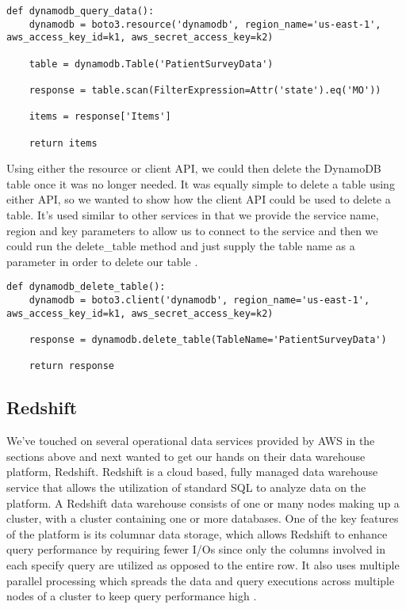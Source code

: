 \begin{verbatim}
def dynamodb_query_data():
    dynamodb = boto3.resource('dynamodb', region_name='us-east-1', aws_access_key_id=k1, aws_secret_access_key=k2)

    table = dynamodb.Table('PatientSurveyData')

    response = table.scan(FilterExpression=Attr('state').eq('MO'))

    items = response['Items']

    return items
\end{verbatim}

Using either the resource or client API, we could then delete the DynamoDB table once it was no longer needed. It was equally simple to delete a table using either API, so we wanted to show how the client API could be used to delete a table. It's used similar to other services in that we provide the service name, region and key parameters to allow us to connect to the service and then we could run the delete_table method and just supply the table name as a parameter in order to delete our table \cite{hid-sp18-521-botodynamodb}.  

\begin{verbatim}
def dynamodb_delete_table():
    dynamodb = boto3.client('dynamodb', region_name='us-east-1', aws_access_key_id=k1, aws_secret_access_key=k2)

    response = dynamodb.delete_table(TableName='PatientSurveyData')

    return response
\end{verbatim}	

\subsection{Redshift}

We've touched on several operational data services provided by AWS in the sections above and next wanted to get our hands on their data warehouse platform, Redshift. Redshift is a cloud based, fully managed data warehouse service that allows the utilization of standard SQL to analyze data on the platform. A Redshift data warehouse consists of one or many nodes making up a cluster, with a cluster containing one or more databases. One of the key features of the platform is its columnar data storage, which allows Redshift to enhance query performance by requiring fewer I/Os since only the columns involved in each specify query are utilized as opposed to the entire row. It also uses multiple parallel processing which spreads the data and query executions across multiple nodes of a cluster to keep query performance high \cite{hid-sp18-521-redshift-gettingstarted}. 

